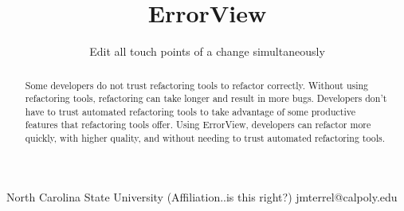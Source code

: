 \documentclass{sigplanconf}
\begin{document}
\setlength{\pdfpageheight}{\paperheight}
\setlength{\pdfpagewidth}{\paperwidth}




\permissiontopublish             %

\newcommand{\pname}{ErrorView}

\title{\pname{}}
\subtitle{Edit all touch points of a change simultaneously}

           {North Carolina State University (Affiliation..is this right?)}
           {jmterrel@calpoly.edu}

\maketitle

\begin{abstract}
Some developers do not trust refactoring tools to refactor correctly. Without
using refactoring tools, refactoring can take longer and result in more bugs.
Developers don't have
to trust automated refactoring tools to take advantage of some productive
features that refactoring tools offer.
Using \pname{}, developers can refactor more quickly, with higher
quality, and without needing to trust automated refactoring tools.
\end{abstract}


\end{document}
